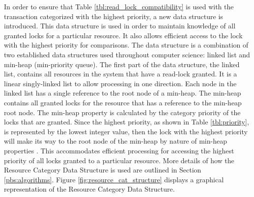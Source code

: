 In order to ensure that Table \ref{tbl:read_lock_compatibility} is used with the transaction categorized with the highest priority, a new data structure is introduced. This data structure is used in order to maintain knowledge of all granted locks for a particular resource. It also allows efficient access to the lock with the highest priority for comparisons. The data structure is a combination of two established data structures used throughout computer science: linked list and min-heap (min-priority queue). The first part of the data structure, the linked list, contains all resources in the system that have a read-lock granted. It is a linear singly-linked list to allow processing in one direction. Each node in the linked list has a single reference to the root node of a min-heap. The min-heap contains all granted locks for the resource that has a reference to the min-heap root node. The min-heap property is calculated by the category priority of the locks that are granted. Since the highest priority, as shown in Table \ref{tbl:priority}, is represented by the lowest integer value, then the lock with the highest priority will make its way to the root node of the min-heap by nature of min-heap properties \cite[p.162]{Cormen_Algorithms}. This accommodates efficient processing for accessing the highest priority of all locks granted to a particular resource. More details of how the Resource Category Data Structure is used are outlined in Section \ref{pbs:algorithms}. Figure \ref{fig:resource_cat_structure} displays a graphical representation of the Resource Category Data Structure.

